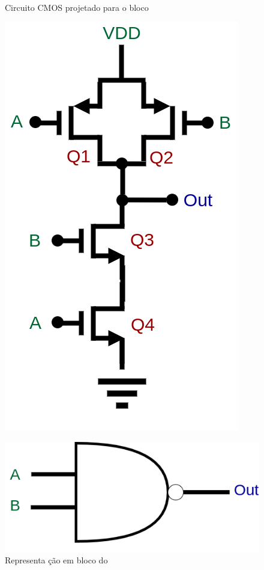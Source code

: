 \begin{figure}[htbp]
 \label{NomePFig}
 \centering
  \begin{minipage}{0.4\textwidth}
    \centering
    \caption{Circuito CMOS projetado para o bloco \NomeBloco} \label{\NomePFig}
    \includegraphics[scale=0.3]{Circuitos/NAND.png}
  \end{minipage}
  \hfill
  \begin{minipage}{0.4\textwidth}
    \centering
    \caption{Representa ção em bloco do \NomeBlocoNoIt} \label{NomeSFig}
    \includegraphics[scale=0.3]{Circuitos/NAND_block.png}
  \end{minipage}
\end{figure}